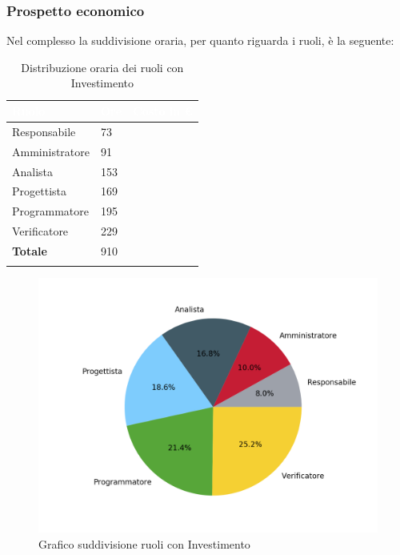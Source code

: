 \subsubsection{Prospetto economico}
Nel complesso la suddivisione oraria, per quanto riguarda i ruoli, è la seguente: 


\begin{longtable}{| C{.30\textwidth}| C{.15\textwidth}| C{.20\textwidth}|}
\hline
{}\textbf{\textcolor{white}{Ruolo}} & \textbf{\textcolor{white}{Ore}} & \textbf{\textcolor{white}{Costo in \euro}} \\
\hline 
Responsabile & 73 & \\
\hline
{}Amministratore & 91 &  \\
\hline
Analista & 153 &  \\
\hline 
{}Progettista & 169 & \\
\hline
Programmatore & 195 &  \\
\hline
{}Verificatore & 229 &  \\
\hline
\textbf{Totale} & 910 &  \\
\hline
\caption{Distribuzione oraria dei ruoli con Investimento}
\label{Distribuzione oraria ruoli con investimento}
\end{longtable}

\begin{figure}[H]
	\centering
  		\includegraphics[width=1\linewidth]{./images/torta_toci.png}
  		\caption{Grafico suddivisione ruoli con Investimento}
  		\label{fig:grafico suddivione ruoli con investimento}
\end{figure}



